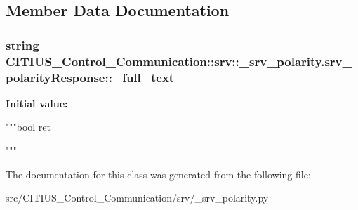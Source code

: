 \subsection{\-Member \-Data \-Documentation}
\hypertarget{class_c_i_t_i_u_s___control___communication_1_1srv_1_1__srv__polarity_1_1srv__polarity_response_afcc7c89fe59dcf3c31724069ce99c7e4}{
\subsubsection[{\-\_\-full\-\_\-text}]{\setlength{\rightskip}{0pt plus 5cm}string \-C\-I\-T\-I\-U\-S\-\_\-\-Control\-\_\-\-Communication\-::srv\-::\-\_\-srv\-\_\-polarity.\-srv\-\_\-polarity\-Response\-::\-\_\-full\-\_\-text}}\label{class_c_i_t_i_u_s___control___communication_1_1srv_1_1__srv__polarity_1_1srv__polarity_response_afcc7c89fe59dcf3c31724069ce99c7e4}
{\bfseries \-Initial value\-:}
\begin{DoxyCode}
"""bool ret


"""
\end{DoxyCode}


\-The documentation for this class was generated from the following file\-:\begin{DoxyCompactItemize}
\item 
src/\-C\-I\-T\-I\-U\-S\-\_\-\-Control\-\_\-\-Communication/srv/\-\_\-srv\-\_\-polarity.\-py\end{DoxyCompactItemize}
